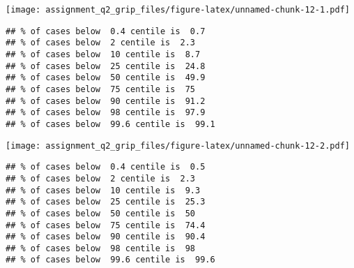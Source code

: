 \texttt{[image: assignment\_q2\_grip\_files/figure-latex/unnamed-chunk-12-1.pdf]}

\begin{Shaded}
\begin{Highlighting}[]
\SpecialCharTok{$} \NormalTok{, } \NormalTok{) }
\end{Highlighting}
\end{Shaded}

\begin{verbatim}
## % of cases below  0.4 centile is  0.7 
## % of cases below  2 centile is  2.3 
## % of cases below  10 centile is  8.7 
## % of cases below  25 centile is  24.8 
## % of cases below  50 centile is  49.9 
## % of cases below  75 centile is  75 
## % of cases below  90 centile is  91.2 
## % of cases below  98 centile is  97.9 
## % of cases below  99.6 centile is  99.1
\end{verbatim}

\begin{Shaded}
\begin{Highlighting}[]
\NormalTok{(}\NormalTok{, }\NormalTok{(}\NormalTok{), }\NormalTok{(}\NormalTok{), }\NormalTok{, }\NormalTok{)}
\end{Highlighting}
\end{Shaded}

\texttt{[image: assignment\_q2\_grip\_files/figure-latex/unnamed-chunk-12-2.pdf]}

\begin{Shaded}
\begin{Highlighting}[]
\SpecialCharTok{$} \NormalTok{, } \NormalTok{)}
\end{Highlighting}
\end{Shaded}

\begin{verbatim}
## % of cases below  0.4 centile is  0.5 
## % of cases below  2 centile is  2.3 
## % of cases below  10 centile is  9.3 
## % of cases below  25 centile is  25.3 
## % of cases below  50 centile is  50 
## % of cases below  75 centile is  74.4 
## % of cases below  90 centile is  90.4 
## % of cases below  98 centile is  98 
## % of cases below  99.6 centile is  99.6
\end{verbatim}

